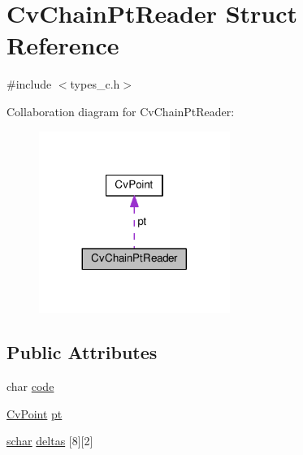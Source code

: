 \hypertarget{structCvChainPtReader}{\section{Cv\-Chain\-Pt\-Reader Struct Reference}
\label{structCvChainPtReader}
}


{\ttfamily \#include $<$types\-\_\-c.\-h$>$}



Collaboration diagram for Cv\-Chain\-Pt\-Reader\-:\nopagebreak
\begin{figure}[H]
\begin{center}
\leavevmode
\includegraphics[width=176pt]{structCvChainPtReader__coll__graph}
\end{center}
\end{figure}
\subsection*{Public Attributes}
\begin{DoxyCompactItemize}
\item 
char \hyperlink{structCvChainPtReader_a9c1efd4be0f72928c9b984a90d3a2028}{code}
\item 
\hyperlink{structCvPoint}{Cv\-Point} \hyperlink{structCvChainPtReader_a0b44d7d5a0cb6d768b95caf4022c35a4}{pt}
\item 
\hyperlink{core_2types__c_8h_a0fd9ce9d735064461bebfe6037026093}{schar} \hyperlink{structCvChainPtReader_a3c70d6cc005e5da1eae1fa9f2e7d5353}{deltas} \mbox{[}8\mbox{]}\mbox{[}2\mbox{]}
\end{DoxyCompactItemize}



